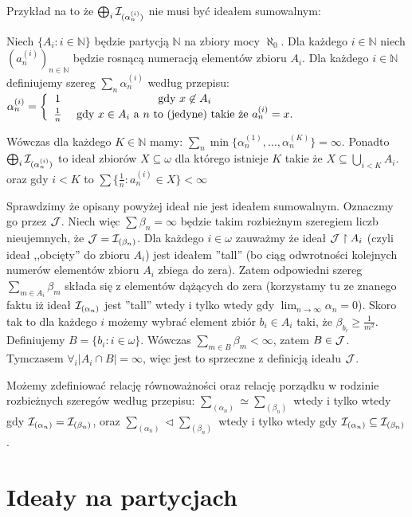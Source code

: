 \documentclass[12pt]{article}
\theoremstyle{plain}
\theoremstyle{definition}
\theoremstyle{remark}
\newcommand{\nnatural}{\mathbb{N}}
\newcommand{\cI}{{\cal I}}
\newcommand{\cJ}{{\cal J}}
\begin{document}
Przykład na to że $\bigoplus_{i}\cI_{(\alpha_n^{(i)})}$ nie musi być
ideałem sumowalnym:
	
Niech $\{A_i\colon i\in\nnatural\}$ będzie partycją $\nnatural$
na zbiory mocy $\aleph_0$. Dla każdego $i\in\nnatural$ niech
$(a_n^{(i)})_{n\in\nnatural}$ będzie rosnącą numeracją
elementów zbioru $A_i$.
Dla każdego $i\in\nnatural$
definiujemy szereg $\sum_n \alpha_n^{(i)}$ według przepisu:
$\alpha_n^{(i)} = 
\left\{
\begin{array}{cc}
1 & \hbox{\ gdy\ } x \not\in A_i\\
\frac{1}{n} & \hbox{\ gdy\ } x \in A_i \hbox{{\ a\ }} n 
\hbox{{\ to\ (jedyne)\ takie\ że\ }} a_n^{(i)} = x.
\end{array}
\right.$

Wówczas dla każdego $K \in \nnatural$ mamy: 
$\sum_n \min \{\alpha_n^{(1)}, \ldots, \alpha_n^{(K)}\} = \infty$.
Ponadto 
$\bigoplus_{i}\cI_{(\alpha_n^{(i)})}$ to ideał zbiorów
$X \subseteq \omega$ dla którego istnieje $K$
takie że 
$X \subseteq \bigcup_{i < K} A_i$.
oraz gdy $i < K$ to 
$\sum \{\frac{1}{n} \colon a_n^{(i)} \in X\} < \infty$


Sprawdzimy że opisany powyżej ideał nie jest ideałem 
sumowalnym. Oznaczmy go przez $\cJ$. Niech więc
$\sum \beta_n = \infty$ będzie takim rozbieżnym szeregiem
liczb nieujemnych, że $\cJ = \cI_{(\beta_n)}$.
Dla każdego $i \in \omega$ zauważmy że ideał 
$\cJ \restriction A_i$ (czyli ideał ,,obcięty'' do zbioru $A_i$)
jest ideałem ''tall'' (bo ciąg odwrotności kolejnych numerów
elementów zbioru $A_i$ zbiega do zera). 
Zatem odpowiedni szereg $\sum_{m\in A_i} \beta_m $
składa się z elementów dążących do zera 
(korzystamy tu ze znanego faktu iż ideał
$\cI_{(\alpha_n)}$ jest ''tall'' wtedy i tylko wtedy
gdy $\lim_{n\to\infty} \alpha_n = 0$).
Skoro tak to dla każdego $i$ możemy wybrać element
zbiór $b_i \in A_i$ taki, że 
$\beta_{b_i} \geq \frac{1}{m^2}$.
Definiujemy $B = \lbrace {b_i\colon i\in\omega} \rbrace$. Wówczas
$\sum_{m\in B} \beta_m < \infty$, zatem $B \in \cJ$.
Tymczasem $\forall_{i} |A_i \cap B| = \infty$,
więc jest to sprzeczne z definicją ideału $\cJ$.


Możemy zdefiniować relację równoważności oraz relację porządku w rodzinie
rozbieżnych szeregów według przepisu:
$\sum_{(\alpha_n)} \simeq \sum_{(\beta_n)}$ wtedy i tylko wtedy gdy
$\cI_{(\alpha_n)} = \cI_{(\beta_n)}$, oraz
$\sum_{(\alpha_n)} \lhd \sum_{(\beta_n)}$ wtedy i tylko wtedy gdy
$\cI_{(\alpha_n)} \subseteq \cI_{(\beta_n)}$.


\section{Ideały na partycjach}
\end{document}
